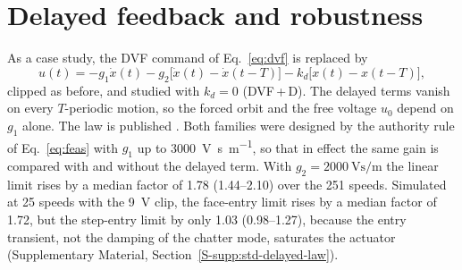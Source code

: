 \section{Delayed feedback and robustness}\label{sec:delayed}

\label{sec:delayed-law}As a case study, the DVF command of Eq.~\eqref{eq:dvf} is replaced by
\begin{equation}\label{eq:comb-law}
  u(t)=-g_1\dot x(t)-g_2\bigl[\dot x(t)-\dot x(t-T)\bigr]-k_d\bigl[x(t)-x(t-T)\bigr],
\end{equation}
clipped as before, and studied with $k_d=0$ (DVF\,+\,D). The delayed terms vanish on every $T$-periodic motion, so the forced orbit and the free voltage $u_0$ depend on $g_1$ alone. The law is published \citep{pyragas1992continuous,vandewouw2015ifac,vandijk2015ijrnc,li2022ijamt}. Both families were designed by the authority rule of Eq.~\eqref{eq:feas} with $g_1$ up to \SI{3000}{\volt\second\per\metre}, so that in effect the same gain is compared with and without the delayed term. With $g_2=\SI{2000}{\volt\second\per\metre}$ the linear limit rises by a median factor of 1.78 (1.44--2.10) over the 251 speeds. Simulated at 25 speeds with the \SI{9}{\volt} clip, the face-entry limit rises by a median factor of 1.72, but the step-entry limit by only 1.03 (0.98--1.27), because the entry transient, not the damping of the chatter mode, saturates the actuator (Supplementary Material, Section~\ref{S-supp:std-delayed-law}).

